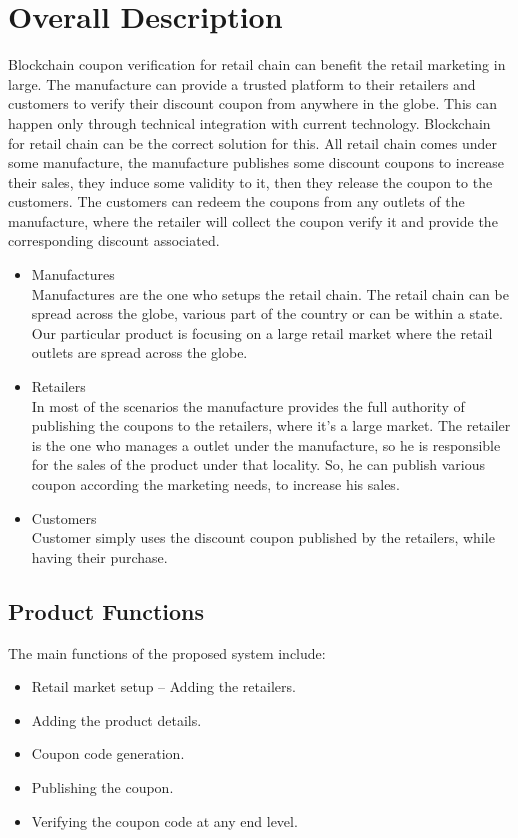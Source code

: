 \section{Overall Description}
\par
Blockchain coupon verification for retail chain can benefit the retail
marketing in large. The manufacture can provide a trusted platform to their
retailers and customers to verify their discount coupon from anywhere in the
globe. This can happen only through technical integration with current
technology. Blockchain for retail chain can be the correct solution for this. All
retail chain comes under some manufacture, the manufacture publishes some
discount coupons to increase their sales, they induce some validity to it, then they
release the coupon to the customers. The customers can redeem the coupons from
any outlets of the manufacture, where the retailer will collect the coupon verify it
and provide the corresponding discount associated.

\begin{itemize}
\item Manufactures\\
 Manufactures are the one who setups the retail chain. The retail chain can
be spread across the globe, various part of the country or can be within a state.
Our particular product is focusing on a large retail market where the retail outlets
are spread across the globe.
\item Retailers \\
 In most of the scenarios the manufacture provides the full authority of
publishing the coupons to the retailers, where it’s a large market.
The retailer is the one who manages a outlet under the manufacture, so he
is responsible for the sales of the product under that locality. So, he can publish
various coupon according the marketing needs, to increase his sales.
\item Customers\\
Customer simply uses the discount coupon published by the retailers, while
having their purchase.
\end{itemize}


\subsection{Product Functions}
The main functions of the proposed system include:
\begin{itemize}
    \item Retail market setup – Adding the retailers.
    \item Adding the product details.
    \item Coupon code generation.
    \item Publishing the coupon.
    \item Verifying the coupon code at any end level.
\end{itemize}

